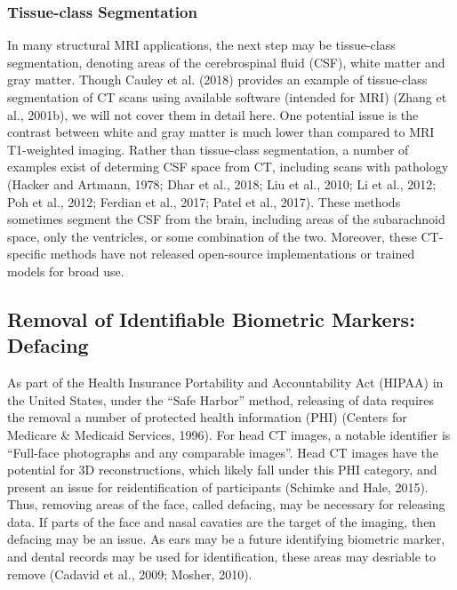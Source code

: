 \documentclass[utf8]{frontiersSCNS}
\begin{document}
\hypertarget{tissue-class-segmentation}{%
\subsubsection{Tissue-class Segmentation}\label{tissue-class-segmentation}}

In many structural MRI applications, the next step may be tissue-class segmentation, denoting areas of the cerebrospinal fluid (CSF), white matter and gray matter. Though Cauley et al. (2018) provides an example of tissue-class segmentation of CT scans using available software (intended for MRI) (Zhang et al., 2001b), we will not cover them in detail here. One potential issue is the contrast between white and gray matter is much lower than compared to MRI T1-weighted imaging. Rather than tissue-class segmentation, a number of examples exist of determing CSF space from CT, including scans with pathology (Hacker and Artmann, 1978; Dhar et al., 2018; Liu et al., 2010; Li et al., 2012; Poh et al., 2012; Ferdian et al., 2017; Patel et al., 2017). These methods sometimes segment the CSF from the brain, including areas of the subarachnoid space, only the ventricles, or some combination of the two. Moreover, these CT-specific methods have not released open-source implementations or trained models for broad use.

\hypertarget{removal-of-identifiable-biometric-markers-defacing}{%
\subsection{Removal of Identifiable Biometric Markers: Defacing}\label{removal-of-identifiable-biometric-markers-defacing}}

As part of the Health Insurance Portability and Accountability Act (HIPAA) in the United States, under the ``Safe Harbor'' method, releasing of data requires the removal a number of protected health information (PHI) (Centers for Medicare \& Medicaid Services, 1996). For head CT images, a notable identifier is ``Full-face photographs and any comparable images''. Head CT images have the potential for 3D reconstructions, which likely fall under this PHI category, and present an issue for reidentification of participants (Schimke and Hale, 2015). Thus, removing areas of the face, called defacing, may be necessary for releasing data. If parts of the face and nasal cavaties are the target of the imaging, then defacing may be an issue. As ears may be a future identifying biometric marker, and dental records may be used for identification, these areas may desriable to remove (Cadavid et al., 2009; Mosher, 2010).
\end{document}
